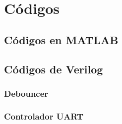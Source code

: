 \chapter{Códigos}

    \section{Códigos en MATLAB}

     

	\section{Códigos de Verilog}
	
	  \subsection{Debouncer}
	  
	  
	
	  \subsection{Controlador UART}
	
	\newpage
    
    
    \newpage
    
    
    \newpage
    
    
    \newpage
    

